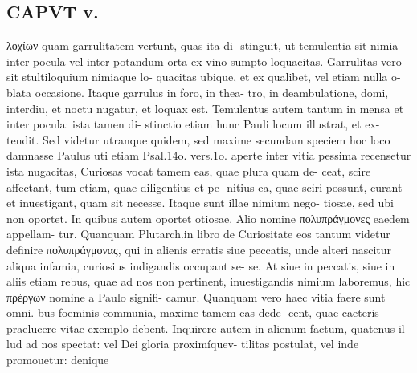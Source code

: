 \documentclass{article}
\begin{document}
\begin{pages}
\section*{CAPVT  v. }
\marginpar{[ p.287 ]}
\marginpar{[ p.0 ]}λοχίων quam garrulitatem vertunt, quas ita di- stinguit, ut temulentia sit nimia inter pocula vel inter potandum orta ex vino sumpto loquacitas. Garrulitas vero sit stultiloquium nimiaque lo- quacitas ubique, et ex qualibet, vel etiam nulla o- blata occasione. Itaque garrulus in foro, in thea- tro, in deambulatione, domi, interdiu, et noctu nugatur, et loquax est. Temulentus autem tantum in mensa et inter pocula: ista tamen di- stinctio etiam hunc Pauli locum illustrat, et ex- tendit. Sed videtur utranque quidem, sed maxime secundam speciem hoc loco damnasse Paulus uti etiam Psal.14o. vers.1o. aperte inter vitia pessima recensetur ista nugacitas, Curiosas vocat tamem eas, quae plura quam de- ceat, scire affectant, tum etiam, quae diligentius et pe- nitius ea, quae sciri possunt, curant et inuestigant, quam sit necesse. Itaque sunt illae nimium nego- tiosae, sed ubi non oportet. In quibus autem oportet otiosae. Alio nomine πολυπράγμονες eaedem appellam- tur. Quanquam Plutarch.in libro de Curiositate eos tantum videtur definire πολυπράγμονας, qui in alienis erratis siue peccatis, unde alteri nascitur aliqua infamia, curiosius indigandis occupant se- se. At siue in peccatis, siue in aliis etiam rebus, quae ad nos non pertinent, inuestigandis nimium laboremus, hic πρέργων nomine a Paulo signifi- camur. Quanquam vero haec vitia faere sunt omni. bus foeminis communia, maxime tamem eas dede- cent, quae caeteris praelucere vitae exemplo debent. Inquirere autem in alienum factum, quatenus il- lud ad nos spectat: vel Dei gloria proximíquev- tilitas postulat, vel inde promouetur: denique 

\end{pages}
\end{document}
